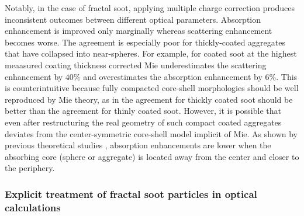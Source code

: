 Notably, in the case of fractal soot, applying multiple charge correction produces inconsistent outcomes between different optical parameters. Absorption enhancement is improved only marginally whereas scattering enhancement becomes worse. The agreement is especially poor for thickly-coated aggregates that have collapsed into near-spheres. For example, for coated soot at the highest meaasured coating thickness corrected Mie underestimates the scattering enhancement by $40\%$ and overestimates the absorption enhancement by $6\%$. This is counterintuitive because fully compacted core-shell morphologies should be well reproduced by Mie theory, as in the agreement for thickly coated soot should be better than the agreement for thinly coated soot. However, it is possible that even after restructuring the real geometry of such compact coated aggregates deviates from the center-symmetric core-shell model implicit of Mie. As shown by previous theoretical studies \citep{RN71,RN72}, absorption enhancements are lower when the absorbing core (sphere or aggregate) is located away from the center and closer to the periphery.

\subsubsection{Explicit treatment of fractal soot particles in optical calculations}



